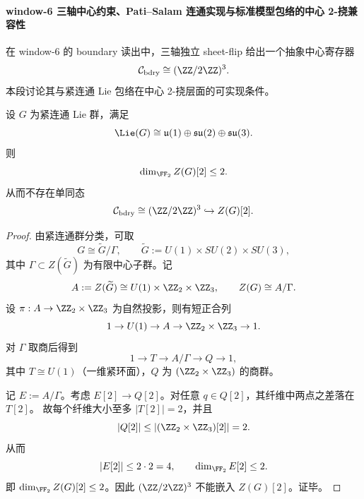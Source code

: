 \paragraph{window-6 三轴中心约束、Pati--Salam 连通实现与标准模型包络的中心 2-挠兼容性}
在 window-6 的 boundary 读出中，三轴独立 sheet-flip 给出一个抽象中心寄存器
\[
\mathcal C_{\mathrm{bdry}}\cong (\ZZ/2\ZZ)^3.
\]
本段讨论其与紧连通 Lie 包络在中心 2-挠层面的可实现条件。

\begin{theorem}[标准模型连通包络对三轴中心寄存器的不可实现性]\label{thm:xi-window6-sm-envelope-center-2torsion-obstruction}
设 \(G\) 为紧连通 Lie 群，满足
\[
\Lie(G)\cong \mathfrak u(1)\oplus\mathfrak{su}(2)\oplus\mathfrak{su}(3).
\]
则
\[
\dim_{\FF_2} Z(G)[2]\le 2.
\]
从而不存在单同态
\[
\mathcal C_{\mathrm{bdry}}\cong (\ZZ/2\ZZ)^3\hookrightarrow Z(G)[2].
\]
\end{theorem}
\begin{proof}
由紧连通群分类，可取
\[
G\cong \widetilde G/\Gamma,\qquad
\widetilde G:=U(1)\times SU(2)\times SU(3),
\]
其中 \(\Gamma\subset Z(\widetilde G)\) 为有限中心子群。记
\[
A:=Z(\widetilde G)\cong U(1)\times \ZZ_2\times \ZZ_3,
\qquad
Z(G)\cong A/\Gamma.
\]
设 \(\pi:A\to \ZZ_2\times \ZZ_3\) 为自然投影，则有短正合列
\[
1\to U(1)\to A\to \ZZ_2\times \ZZ_3\to 1.
\]
对 \(\Gamma\) 取商后得到
\[
1\to T\to A/\Gamma\to Q\to 1,
\]
其中 \(T\cong U(1)\)（一维紧环面），\(Q\) 为 \((\ZZ_2\times \ZZ_3)\) 的商群。

记 \(E:=A/\Gamma\)。考虑 \(E[2]\to Q[2]\)。对任意 \(q\in Q[2]\)，其纤维中两点之差落在 \(T[2]\)。
故每个纤维大小至多 \(|T[2]|=2\)，并且
\[
|Q[2]|\le |(\ZZ_2\times \ZZ_3)[2]|=2.
\]
从而
\[
|E[2]|\le 2\cdot 2=4,\qquad
\dim_{\FF_2}E[2]\le 2.
\]
即 \(\dim_{\FF_2} Z(G)[2]\le 2\)。因此 \((\ZZ/2\ZZ)^3\) 不能嵌入 \(Z(G)[2]\)。证毕。
\end{proof}

